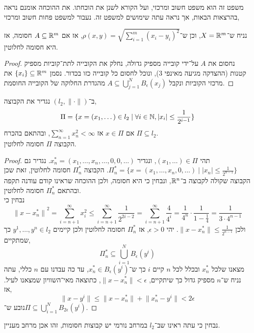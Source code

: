 משפט זה הוא משפט חשוב ומרכזי, ועל הקורא לשנן את הוכחתו. את ההוכחה אומנם נראה בהרצאות הבאות, אך נראה עתה שימושים למשפט זה.
נעבור למשפט פחות חשוב ומרכזי,
\begin{theorem}
	נניח ש־$X = \mathbb{R}^m$, וכן ש־$\rho(x, y) = \sqrt{\sum_{i = 1}^{m} {(x_i - y_i)}^2}$, אז אם $A \subseteq \mathbb{R}^m$ חסומה, אז היא חסומה לחלוטין.
\end{theorem}
\begin{proof}
	נחסום את $A$ על־ידי קובייה מספיק גדולה, נחלק את הקובייה לתת־קוביות מספיק קטנות (ההצדקה מגיעה מאינפי 3), ונוכל לחסום כל קובייה כזו בכדור.
	נסמן $\{ x_i \} \subseteq \mathbb{R}^m$ את מרכזי הקוביות ונקבל $A \subseteq \bigcup_{j = 1}^N B_\epsilon(x_j)$ מהגדרת החלוקה של הקובייה החוסמת.
\end{proof}
\begin{proposition}
	ב־$(l_2, \lVert \cdot \rVert)$ נגדיר את הקבוצה,
	\[
		\Pi = \{ x = (x_1, \dots) \in l_2 \mid \forall i \in \mathbb{N}, |x_i| \le \frac{1}{2^{i - 1}} \}
	\]
	אם $x \in \Pi$ אז $\sum_{n = 1}^{\infty} x_n^2 < \infty$, ובהתאם בהכרח $\Pi \subseteq l_2$. \\
	הקבוצה $\Pi$ חסומה לחלוטין.
\end{proposition}
\begin{proof}
	תהי $(x_1, \dots) \in \Pi$, ונגדיר $x_n^* = (x_1, \dots, x_n, \dots, 0, 0, \dots)$.
	נגדיר גם $\Pi^*_n = \{ x = (x_1, \dots, x_n, 0, \dots) \mid |x_n| \le \frac{1}{2^{n - 1}} \}$.
	הקבוצה $\Pi_n^*$ חסומה לחלוטין, זאת שכן הקבוצה שקולה לקבוצה ב־$\mathbb{R}^n$, ונבחין כי היא חסומה, ולכן ההוכחה שראינו קודם עודנה תקפה ובהתאם $\Pi_n^*$ חסומה לחלוטין. \\
	נבחין כי
	\[
		{\lVert x - x_n^* \rVert}^2
		= \sum_{i = n + 1}^{\infty} x_i^2
		\le \sum_{i = n + 1}^{\infty} \frac{1}{2^{2i - 2}}
		= \sum_{i = n + 1}^{\infty} \frac{4}{4^i}
		= \frac{1}{4^n} \cdot \frac{1}{1 - \frac{1}{4}}
		= \frac{1}{3 \cdot 4^{n - 1}}
	\]
	ולכן $\lVert x - x_n^* \rVert \le \frac{1}{2^{n - 1}}$.
	יהי $\epsilon > 0$, אז $\Pi_n^*$ חסומה לחלוטין ולכן קיימים $y^1, \dots, y^n \in l_2$ כך שמתקיים,
	\[
		\Pi_n^* \subseteq \bigcup_{i = 1}^N B_\epsilon(y^i)
	\]
	מצאנו שלכל $x_n^*$ ובכלל לכל $n$ קיים $i$ כך ש־$x_n^* \in B_{\epsilon}(y^i)$,
	עד כה עבדנו עם $n$ כללי, עתה נניח ש־$n$ מספיק גדול כך שיתקיים, $\lVert x - x_n^* \rVert < \epsilon$, כתוצאה מאי־השוויון שמצאנו לעיל.
	אז,
	\[
		\lVert x - y^i \rVert
		\le \lVert x - x_n^* \rVert + \lVert x_n^* - y^i \rVert
		< 2 \epsilon
	\]
	נובע ש־$\Pi \subseteq \bigcup_{i = 1}^N B_{2\epsilon}(y^i)$.
\end{proof}
נבחין כי עתה ראינו שב־$l_2$ במרחב נורמי יש קבוצות חסומות, זהו אכן מרחב מעניין.

